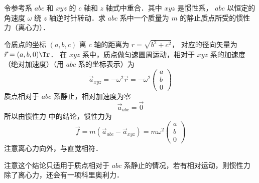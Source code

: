 

令参考系 $abc$ 和 $xyz$ 的 $c$ 轴和 $z$ 轴式中重合．其中 $xyz$ 是惯性系， $abc$ 以恒定的角速度 $\omega$ 绕 $z$ 轴逆时针转动．求 $abc$ 系中一个质量为 $m$ 的静止质点所受的惯性力（离心力）．

令质点的坐标 $(a,b,c)$ 离 $c$ 轴的距离为 $r = \sqrt {{b^2} + {c^2}}$， 对应的径向矢量为 $\vec r = (a,b,0)\Tr$． 在 $xyz$ 系中，质点做匀速圆周运动，相对于 $xyz$ 系的加速度（绝对加速度）（用 $abc$ 系的坐标表示）为
\begin{equation}
{\vec a_{xyz}} =  - {\omega ^2}\vec r =  - {\omega ^2}\begin{pmatrix} a\\b\\0 \end{pmatrix}
\end{equation}
质点相对于 $abc$ 系静止，相对加速度为零
\begin{equation}
{\vec a_{abc}} = \vec 0
\end{equation}
所以由惯性力 中的结论，惯性力为
\begin{equation}
\vec f = m\left( {{{\vec a}_{abc}} - {{\vec a}_{xyz}}} \right) = m{\omega ^2}\begin{pmatrix} a\\b\\0 \end{pmatrix}
\end{equation}
注意离心力向外，与直觉相符．

注意这个结论只适用于质点相对于 $abc$ 系静止的情况，若有相对运动，则惯性力除了离心力，还会有一项科里奥利力．
